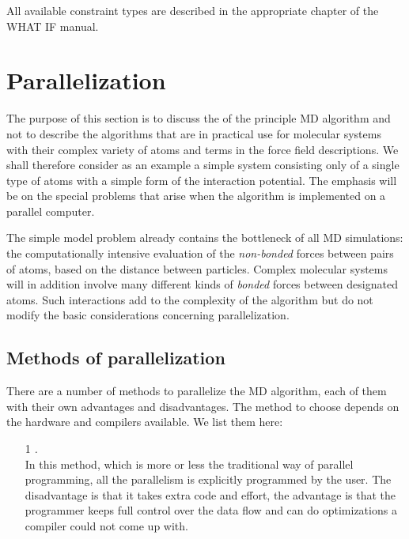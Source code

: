 {All available constraint types are described in the appropriate chapter
of the WHAT IF \cite{Whatif} manual.


\section{Parallelization}
\label{sec:par}

\newcommand{\abs}[1]{\mid \! {#1} \! \mid}

The purpose of this section is to discuss the 
 of the 
principle MD algorithm and not to describe the algorithms that are in 
practical use for molecular systems with their complex variety of atoms 
and terms in the force field descriptions. We shall therefore consider 
as an example a simple system consisting only of a single type of atoms 
with a simple form of the interaction potential. The emphasis will be 
on the special problems that arise when the algorithm is implemented on 
a parallel computer. 

The simple model problem already contains the bottleneck of all MD 
simulations: the computationally intensive evaluation of the 
{\em non-bonded} forces between pairs of atoms, based on the distance 
between particles. Complex molecular systems will in addition 
involve many different kinds of {\em bonded} forces between designated 
atoms. Such interactions add to the complexity of the algorithm but do 
not modify the basic considerations concerning parallelization.


\subsection{Methods of parallelization}
There are a number of methods to parallelize the MD algorithm, each of
them with their own advantages and disadvantages. The method to 
choose depends on the hardware and compilers available.
We list them here:
\begin{enumerate}
\item[1]        {\em {}.}\\
                In this method, which is more or less the traditional
                way of parallel programming, all the parallelism is
                explicitly programmed by the user. The disadvantage
                is that it takes extra code and effort, the advantage
                is that the programmer keeps full control over the data
                flow and can do optimizations a compiler could not come 
                up with. 


\end{enumerate}}
